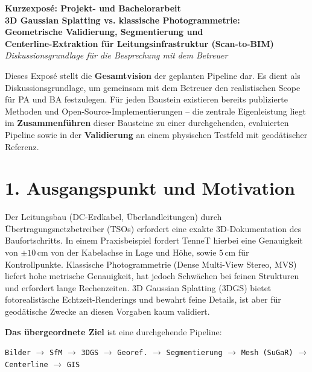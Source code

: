 \documentclass[11pt, a4paper]{article}
\begin{document}
\begin{center}
\textbf{\Large Kurzexposé: Projekt- und Bachelorarbeit} \\[0.5em]
\textbf{\large 3D Gaussian Splatting vs. klassische Photogrammetrie:\\ Geometrische Validierung, Segmentierung und\\ Centerline-Extraktion für Leitungsinfrastruktur (Scan-to-BIM)}\\[1em]
\textit{Diskussionsgrundlage für die Besprechung mit dem Betreuer}
\end{center}

\vspace{0.5em}

\begin{tcolorbox}[colback=notebg, colframe=noteblue, title=\textbf{Hinweis zur Einordnung dieses Dokuments}]
Dieses Exposé stellt die \textbf{Gesamtvision} der geplanten Pipeline dar. Es dient als Diskussionsgrundlage, um gemeinsam mit dem Betreuer den realistischen Scope für PA und BA festzulegen. Für jeden Baustein existieren bereits publizierte Methoden und Open-Source-Implementierungen -- die zentrale Eigenleistung liegt im \textbf{Zusammenführen} dieser Bausteine zu einer durchgehenden, evaluierten Pipeline sowie in der \textbf{Validierung} an einem physischen Testfeld mit geodätischer Referenz.
\end{tcolorbox}

\section*{1. Ausgangspunkt und Motivation}

Der Leitungsbau (DC-Erdkabel, Überlandleitungen) durch Übertragungsnetzbetreiber (TSOs) erfordert eine exakte 3D-Dokumentation des Baufortschritts. In einem Praxisbeispiel fordert TenneT hierbei eine Genauigkeit von $\pm 10$\,cm von der Kabelachse in Lage und Höhe, sowie $5$\,cm für Kontrollpunkte. Klassische Photogrammetrie (Dense Multi-View Stereo, MVS) liefert hohe metrische Genauigkeit, hat jedoch Schwächen bei feinen Strukturen und erfordert lange Rechenzeiten. 3D Gaussian Splatting (3DGS) bietet fotorealistische Echtzeit-Renderings und bewahrt feine Details, ist aber für geodätische Zwecke an diesen Vorgaben kaum validiert.

\textbf{Das übergeordnete Ziel} ist eine durchgehende Pipeline:
\begin{center}
\texttt{Bilder} $\rightarrow$ \texttt{SfM} $\rightarrow$ \texttt{3DGS} $\rightarrow$ \texttt{Georef.} $\rightarrow$ \texttt{Segmentierung} $\rightarrow$ \texttt{Mesh (SuGaR)} $\rightarrow$ \texttt{Centerline} $\rightarrow$ \texttt{GIS}
\end{center}
\end{document}
